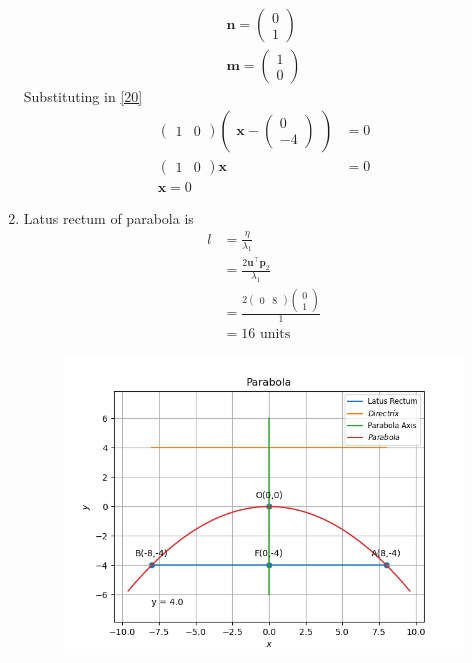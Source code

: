 \documentclass[12pt]{article}
\newcommand{\myvec}[1]{\ensuremath{\begin{pmatrix}#1\end{pmatrix}}}
\let\vec\mathbf
\begin{document}
\begin{enumerate}
\begin{align}
	\vec{n} = \myvec{0\\1}\\
	\vec{m} = \myvec{1\\0}
\end{align}
Substituting in \eqref{20}
\begin{align}
	\myvec{1&0}\myvec{\vec{x}-\myvec{0\\-4}}&=0\\
	\myvec{1&0}\vec{x} &= 0\\
	\vec{x}=0
\end{align}
\item Latus rectum of  parabola is 
\begin{align}
	l&=\frac{\eta}{\lambda_1}\\
	 &=\frac{2\vec{u}^\top \vec{p}_2}{\lambda_1}\\
	 &=\frac{2\myvec{0&8}\myvec{0\\1}}{1}\\
	 &=16 \text{ units }
\end{align}
\begin{figure}[!h]
	\begin{center} 
	    \includegraphics[width=\columnwidth]{figs/parabola}
	\end{center}
\caption{}
\label{fig:Fig1}
\end{figure}
\end{enumerate}
\end{document}

